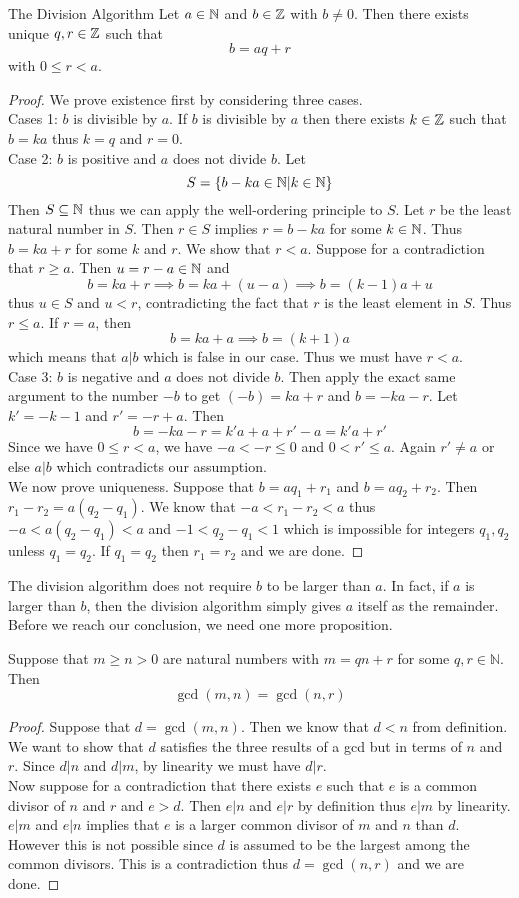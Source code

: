 \documentclass[a4paper]{article}
\begin{document}
\begin{thm}{The Division Algorithm}{} Let $a\in\mathbb{N}$ and $b\in\mathbb{Z}$ with $b\neq 0$. Then there exists unique $q,r\in\mathbb{Z}$ such that $$b=aq+r$$ with $0\leq r<a$. 
\begin{proof}
We prove existence first by considering three cases. \\
Cases 1: $b$ is divisible by $a$.  If $b$ is divisible by $a$ then there exists $k\in\mathbb{Z}$ such that $b=ka$ thus $k=q$ and $r=0$. \\
Case 2: $b$ is positive and $a$ does not divide $b$. Let $$S=\{b-ka\in\mathbb{N}|k\in\mathbb{N}\}$$ Then $S\subseteq\mathbb{N}$ thus we can apply the well-ordering principle to $S$. Let $r$ be the least natural number in $S$. Then $r\in S$ implies $r=b-ka$ for some $k\in\mathbb{N}$. Thus $b=ka+r$ for some $k$ and $r$. We show that $r<a$. Suppose for a contradiction that $r\geq a$. Then $u=r-a\in\mathbb{N}$ and $$b=ka+r\implies b=ka+(u-a)\implies b=(k-1)a+u$$ thus $u\in S$ and $u<r$, contradicting the fact that $r$ is the least element in $S$. Thus $r\leq a$. If $r=a$, then $$b=ka+a\implies b=(k+1)a$$ which means that $a|b$ which is false in our case. Thus we must have $r<a$. \\
Case 3: $b$ is negative and $a$ does not divide $b$. Then apply the exact same argument to the number $-b$ to get $(-b)=ka+r$ and $b=-ka-r$. Let $k'=-k-1$ and $r'=-r+a$. Then $$b=-ka-r=k'a+a+r'-a=k'a+r'$$ Since we have $0\leq r<a$, we have $-a<-r\leq 0$ and $0<r'\leq a$. Again $r'\neq a$ or else $a|b$ which contradicts our assumption. \\
We now prove uniqueness. Suppose that $b=aq_1+r_1$ and $b=aq_2+r_2$. Then $r_1-r_2=a(q_2-q_1)$. We know that $-a<r_1-r_2<a$ thus $-a<a(q_2-q_1)<a$ and $-1<q_2-q_1<1$ which is impossible for integers $q_1,q_2$ unless $q_1=q_2$. If $q_1=q_2$ then $r_1=r_2$ and we are done. 
\end{proof}
\end{thm}

The division algorithm does not require $b$ to be larger than $a$. In fact, if $a$ is larger than $b$, then the division algorithm simply gives $a$ itself as the remainder. Before we reach our conclusion, we need one more proposition. 

\begin{prp}{}{} Suppose that $m\geq n>0$ are natural numbers with $m=qn+r$ for some $q,r\in\mathbb{N}$. Then $$\gcd{(m,n)}=\gcd{(n,r)}$$ 
\begin{proof}
Suppose that $d=\gcd(m,n)$. Then we know that $d<n$ from definition. We want to show that $d$ satisfies the three results of a gcd but in terms of $n$ and $r$. Since $d|n$ and $d|m$, by linearity we must have $d|r$. \\
Now suppose for a contradiction that there exists $e$ such that $e$ is a common divisor of $n$ and $r$ and $e>d$. Then $e|n$ and $e|r$ by definition thus $e|m$ by linearity. $e|m$ and $e|n$ implies that $e$ is a larger common divisor of $m$ and $n$ than $d$. However this is not possible since $d$ is assumed to be the largest among the common divisors. This is a contradiction thus $d=\gcd(n,r)$ and we are done. 
\end{proof}
\end{prp}
\end{document}
